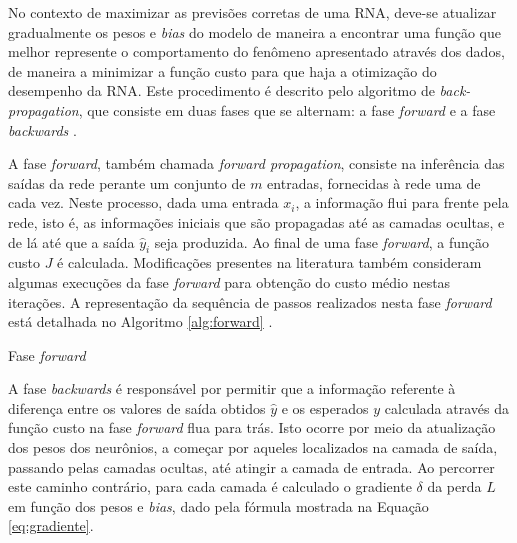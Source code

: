 No contexto de maximizar as previsões corretas de uma RNA, deve-se atualizar gradualmente os pesos e \emph{bias} do modelo de maneira a encontrar uma função que melhor represente o comportamento do fenômeno apresentado através dos dados, de maneira a minimizar a função custo para que haja a otimização do desempenho da RNA. Este procedimento é descrito pelo algoritmo de \emph{back-propagation}, que consiste em duas fases que se alternam: a fase \emph{forward} e a fase \emph{backwards} \cite{haykin2009neural}.

A fase \emph{forward}, também chamada \emph{forward propagation}, consiste na inferência das saídas da rede perante um conjunto de $m$ entradas, fornecidas à rede uma de cada vez. Neste processo, dada uma entrada $x_i$, a informação flui para frente  pela rede, isto é, as informações iniciais que são propagadas até as camadas ocultas, e de lá até que a saída $\hat{y}_i$ seja produzida. Ao final de uma fase \emph{forward}, a função custo $J$ é calculada. Modificações presentes na literatura também consideram algumas execuções da fase \emph{forward} para obtenção do custo médio nestas iterações. A representação da sequência de passos realizados nesta fase \emph{forward} está detalhada no Algoritmo \ref{alg:forward} \cite{haykin2009neural, goodfellow2016deep}.

\begin{algorithm}
	\caption{Fase \emph{forward}}\label{alg:forward}
\end{algorithm}

A fase \emph{backwards} é responsável por permitir que a informação referente à diferença entre os valores de saída obtidos $\hat{y}$ e os esperados $y$ calculada através da função custo na fase \emph{forward} flua para trás. Isto ocorre por meio da atualização dos pesos dos neurônios, a começar por aqueles localizados na camada de saída, passando pelas camadas ocultas, até atingir a camada de entrada. Ao percorrer este caminho contrário, para cada camada é calculado o gradiente $\delta$ da perda $L$ em função dos pesos e \emph{bias}, dado pela fórmula mostrada na Equação \ref{eq:gradiente}.


